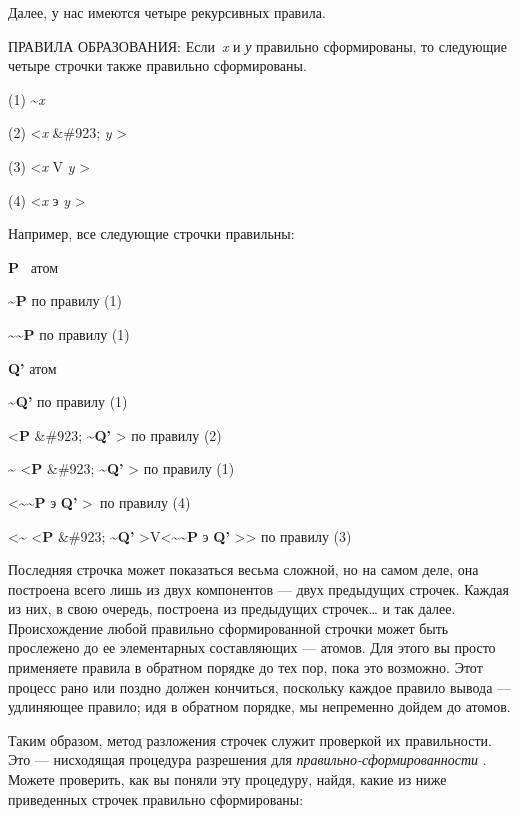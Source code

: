 Далее, у нас имеются четыре рекурсивных правила.

ПРАВИЛА ОБРАЗОВАНИЯ: Если~\emph{x} и \emph{у} правильно сформированы, то следующие четыре строчки также правильно сформированы.

(1) \textasciitilde{}\emph{x}

(2) \textless{}\emph{x} \&\#923; \emph{y} \textgreater{}

(3) \textless{}\emph{x} V \emph{y} \textgreater{}

(4) \textless{}\emph{x} э \emph{y} \textgreater{}

Например, все следующие строчки правильны:

\textbf{P} ~атом

\textbf{\textasciitilde P} по правилу (1)

\textbf{\textasciitilde\textasciitilde P} по правилу (1)

\textbf{Q'} атом

\textbf{\textasciitilde Q'} по правилу (1)

\textless{}\textbf{P} \&\#923; \textbf{\textasciitilde Q'} \textgreater{} по правилу (2)

\textbf{\textasciitilde{}} \textless{}\textbf{P} \&\#923; \textbf{\textasciitilde Q'} \textgreater{} по правилу (1)

\textless{}\textbf{\textasciitilde\textasciitilde P} э \textbf{Q'} \textgreater~по правилу (4)

\textless{}\textbf{\textasciitilde{}} \textless{}\textbf{P} \&\#923; \textbf{\textasciitilde Q'} \textgreater V\textless{}\textbf{\textasciitilde\textasciitilde P} э \textbf{Q'} \textgreater\textgreater{} по правилу (3)

Последняя строчка может показаться весьма сложной, но на самом деле, она построена всего лишь из двух компонентов --- двух предыдущих строчек. Каждая из них, в свою очередь, построена из предыдущих строчек\ldots{} и так далее. Происхождение любой правильно сформированной строчки может быть прослежено до ее элементарных составляющих --- атомов. Для этого вы просто применяете правила в обратном порядке до тех пор, пока это возможно. Этот процесс рано или поздно должен кончиться, поскольку каждое правило вывода --- удлиняющее правило; идя в обратном порядке, мы непременно дойдем до атомов.

Таким образом, метод разложения строчек служит проверкой их правильности. Это --- нисходящая процедура разрешения для \emph{правильно-сформированности} . Можете проверить, как вы поняли эту процедуру, найдя, какие из ниже приведенных строчек правильно сформированы:

